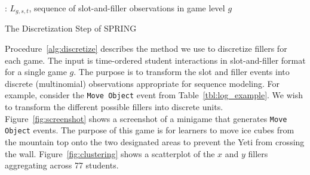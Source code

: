 \documentclass{sigchi}
\def\algname{SPRING\xspace}
\begin{document}
	\begin{algorithm}[ht]
		\begin{algorithmic}[1]
			\Require: $L_{g,s,t}$, sequence of slot-and-filler observations in game level $g$
			\EndFor

			\State
				\EndIf
			\EndFor
			\EndFor
			\State {}
			\EndProcedure
			
		\end{algorithmic}
		\caption{The Discretization Step of \algname \label{alg:discretize}}
	\end{algorithm}
	

	Procedure~\ref{alg:discretize} describes the method we use to discretize fillers for each game.
	The input is time-ordered student interactions in slot-and-filler format for a single game $g$.
	The purpose is to transform the slot and filler events into  discrete (multinomial) observations appropriate for sequence modeling.
	For example, consider the \texttt{Move Object} event from Table~\ref{tbl:log_example}.
	We wish to transform the different possible fillers into discrete units.
	Figure~\ref{fig:screenshot} shows a screenshot of a minigame that generates  \texttt{Move Object} events.
	The purpose of this game is for learners to move ice cubes from the mountain top onto the two designated areas to prevent the Yeti from crossing the wall.
	Figure~\ref{fig:clustering} shows a scatterplot of the $x$ and $y$ fillers aggregating across 77 students.
	
\end{document}
